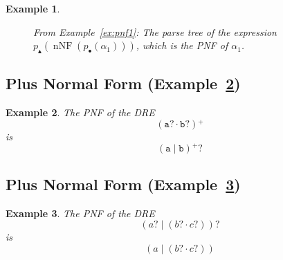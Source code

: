 \documentclass[a4paper,11pt, svgnames,titlepage]{article}
\newcommand{\rxp}{{^\mathtt{+}}}
\newcommand{\rxo}{\mathtt{?}}
\newcommand{\rxc}{\cdot}
\DeclareMathOperator{\ror}{\mathtt{|}}
\newcommand{\wpnffun}{p_{\bullet}}
\newcommand{\pnfupfun}{p_{\blacktriangle}}
\newcommand{\wpnf}[1]{\wpnffun{\left(#1\right)}}
\newcommand{\pnfup}[1]{\pnfupfun{\left(#1\right)}}
\DeclareMathOperator{\nnf}{nNF}
\newtheorem{example}{Example}
\begin{document}
\begin{example}
\begin{figure}
		\begin{center}
		\end{center}
		\caption{\label{fig:pnf-alpha}From Example~\ref{ex:pnf1}: The parse tree of the expression $\pnfup{\nnf(\wpnf{\alpha_1})}$, which is the PNF of $\alpha_1$.}
	\end{figure}
\end{example}
\subsection{Plus Normal Form (Example~\ref{ex:pnf2})}
\begin{example}\label{ex:pnf2}
	The PNF of the DRE
	\[ 
	\left(   
	\mathtt{a}\rxo
	\rxc
	\mathtt{b}\rxo
	\right)\rxp
	\]
	is 
	\[
	\left(\mathtt{a} \ror \mathtt{b}\right)\rxp\rxo
	\]
\end{example}
\subsection{Plus Normal Form (Example~\ref{ex:pnf3})}
\begin{example}\label{ex:pnf3}
	The PNF of the DRE
	\[
	\left( a\rxo \ror \left( b\rxo \rxc c\rxo \right)\right)\rxo 
	\]
	is 
	\[ \left(a \ror \left( b\rxo \rxc c\rxo  \right) \right)
	\]
\end{example}
\newpage
\end{document}
